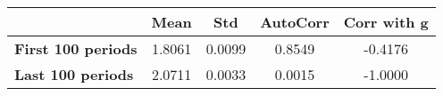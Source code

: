 \begin{tiny}\begin{tabular}{|l|c|c|c|c|}
\hline
&\textbf{Mean}&\textbf{Std}&\textbf{AutoCorr}&\textbf{Corr with g}\\\hline
\textbf{First 100 periods}&1.8061&0.0099&0.8549&-0.4176\\\hline
\textbf{Last 100 periods}&2.0711&0.0033&0.0015&-1.0000\\\hline
\end{tabular}
\end{tiny}